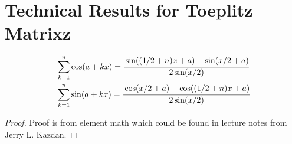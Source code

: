 \section{Technical Results for Toeplitz Matrixz}
\begin{lem}
\label{lemma:sin_cos_seq_sum}
\begin{equation}
\begin{aligned}
&\sum_{k=1}^n \cos(a+kx) = \cfrac{\sin((1/2+n)x+a)-\sin(x/2+a)}{2\sin(x/2)}\\
&\sum_{k=1}^n \sin(a+kx) = \cfrac{\cos(x/2+a)-\cos((1/2+n)x+a)}{2\sin(x/2)}
\end{aligned}
\end{equation}
\begin{proof}
Proof is from element math which could be found in lecture notes from Jerry L. Kazdan. 
\end{proof}
\end{lem}


